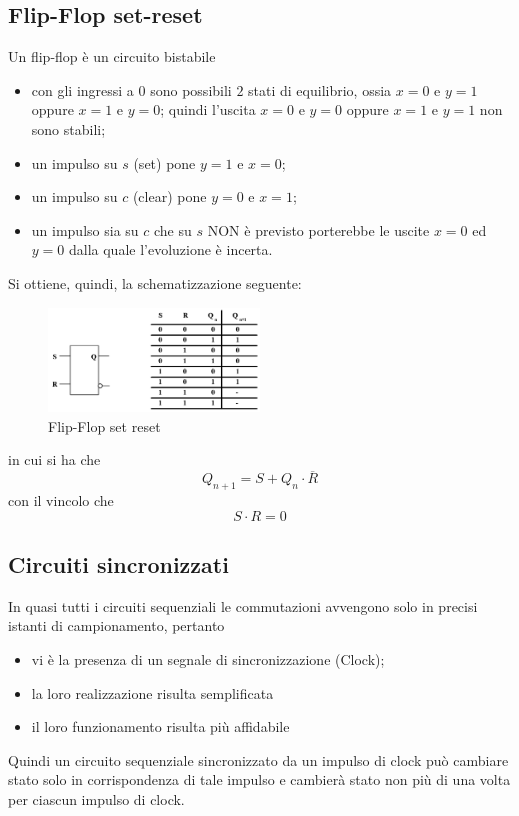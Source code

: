 \documentclass[a4paper]{extarticle}
\begin{document}
\vspace{1em}
\subsection{Flip-Flop set-reset}
Un flip-flop è un circuito bistabile
\begin{itemize}
    \item con gli ingressi a $0$ sono possibili $2$ stati di equilibrio, ossia $x=0$ e $y=1$ oppure $x=1$ e $y=0$; quindi l'uscita $x=0$ e $y=0$ oppure $x=1$ e $y=1$ non sono stabili;
    \item un impulso su $s$ (set) pone $y=1$ e $x=0$;
    \item un impulso su $c$ (clear) pone $y=0$ e $x=1$;
    \item un impulso sia su $c$ che su $s$ NON è previsto porterebbe le uscite $x=0$ ed $y=0$ dalla quale l'evoluzione è incerta.
\end{itemize}
Si ottiene, quindi, la schematizzazione seguente:

\begin{figure}[H]
    \centering
    \includegraphics[width=0.5\textwidth]{flip-flop-set-reset.png}
    \caption{Flip-Flop set reset}
    \label{fig:flip-flop-set-reset}
\end{figure}

\vspace{1em}
\noindent
in cui si ha che
\[Q_{n+1} = S + Q_n \cdot \overline{R}\]
con il vincolo che
\[S \cdot R = 0\]

\vspace{1em}
\subsection{Circuiti sincronizzati}
In quasi tutti i circuiti sequenziali le commutazioni avvengono solo in precisi istanti di campionamento, pertanto
\begin{itemize}
    \item vi è la presenza di un segnale di sincronizzazione (Clock);
    \item la loro realizzazione risulta semplificata
    \item il loro funzionamento risulta più affidabile
\end{itemize}
Quindi un circuito sequenziale sincronizzato da un impulso di clock può cambiare stato solo in corrispondenza di tale impulso e cambierà stato non più di una volta per ciascun impulso di clock.
\end{document}
